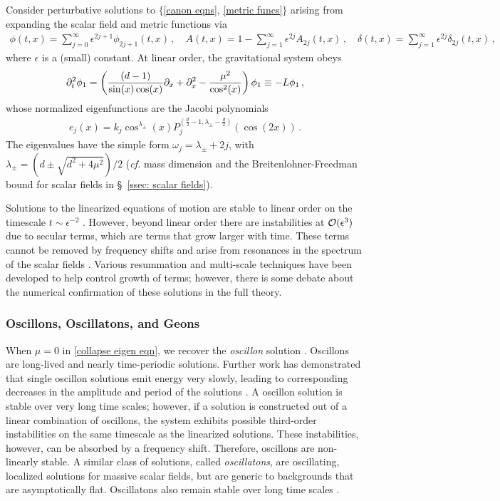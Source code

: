 \documentclass[../PhD.tex]{subfiles}
\begin{document}
Consider perturbative solutions to $\{$\eqref{canon eqns}, \eqref{metric funcs}$\}$ arising from expanding the scalar field and metric functions via
\begin{align}
\phi(t,x) = \sum_{j=0}^{\infty} \epsilon^{2j + 1} \phi_{2j + 1} (t,x) \, , \quad A(t,x) = 1 - \sum_{j=1}^\infty \epsilon^{2j} A_{2j} (t,x) \, , \quad \delta(t,x) = \sum_{j=1}^\infty \epsilon^{2j} \delta_{2j} (t,x) \, ,
\end{align}
where $\epsilon$ is a (small) constant. At linear order, the gravitational system obeys
\begin{align}
\label{collapse eigen eqn}
\partial_t^2 \phi_1 = \left( \frac{ (d-1)}{\sin (x) \cos (x)} \partial_x + \partial^2_x - \frac{\mu^2}{\cos^2 (x)} \right) \phi_1 \equiv - L \phi_1 \, ,
\end{align}
whose normalized eigenfunctions are the Jacobi polynomials
\begin{align}
\label{scalar eigens}
e_j (x) = k_j \cos^{\lambda_\pm}(x) P_j^{(\frac{d}{2} - 1, \lambda_\pm - \frac{d}{2})} \left( \cos \left( 2x \right)\right) \, .
\end{align}
The eigenvalues have the simple form $\omega_j = \lambda_\pm + 2j$, with $\lambda_\pm = (d \pm \sqrt{d^2 + 4\mu^2})/2$ ({\it cf.} mass dimension and the Breitenlohner-Freedman bound for scalar fields in \S~\!\ref{ssec: scalar fields}). 

Solutions to the linearized equations of motion are stable to linear order on the timescale $t \sim \epsilon^{-2}$ \cite{1506.07907}. However, beyond linear order there are instabilities at $\mathcal O(\epsilon^3)$ due to secular terms, which are terms that grow larger with time. These terms cannot be removed by frequency shifts and arise from resonances in the spectrum of the scalar fields  \cite{1407.6273}. Various resummation \cite{hep-th/9506161} and multi-scale techniques \cite{1403.6471} have been developed to help control growth of terms; however, there is some debate about the numerical confirmation of these solutions in the full theory.

\subsubsection{Oscillons, Oscillatons, and Geons}
\label{sub: geons}

When $\mu = 0$ in \eqref{collapse eigen eqn}, we recover the \emph{oscillon} solution \cite{1701.09100}. Oscillons are long-lived and nearly time-periodic solutions. Further work has demonstrated that single oscillon solutions emit energy very slowly, leading to corresponding decreases in the amplitude and period of the solutions \cite{hep-ph/9503217}. A oscillon solution is stable over very long time scales; however, if a solution is constructed out of a linear combination of oscillons, the system exhibits possible third-order instabilities on the same timescale as the linearized solutions. These instabilities, however, can be absorbed by a frequency shift. Therefore, oscillons are non-linearly stable. A similar class of solutions, called \emph{oscillatons}, are oscillating, localized solutions for massive scalar fields, but are generic to backgrounds that are asymptotically flat. Oscillatons also remain stable over long time scales \cite{gr-qc/0310006}.
\end{document}
